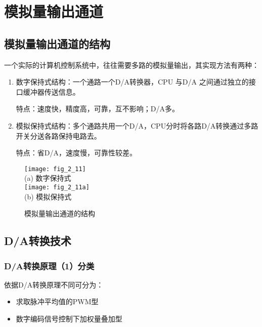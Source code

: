 \section{模拟量输出通道}


\subsection{模拟量输出通道的结构}


一个实际的计算机控制系统中，往往需要多路的模拟量输出，其实现方法有两种：

\begin{enumerate}
  \item 数字保持式结构：一个通路一个D/A转换器，CPU 与D/A 之间通过独立的接口缓冲器传送信息。

      特点：速度快，精度高，可靠，互不影响；D/A多。

  \item 模拟保持式结构：多个通路共用一个D/A，CPU分时将各路D/A转换通过多路开关分送各路保持电路去。

特点：省D/A，速度慢，可靠性较差。

\end{enumerate}

\begin{figure}[h]
  \centering
  \texttt{[image: fig\_2\_11]}\\(a) 数字保持式\\
  \texttt{[image: fig\_2\_11a]}\\(b) 模拟保持式
  \caption{模拟量输出通道的结构}\label{fig_2_11}
\end{figure}

\subsection{D/A转换技术}






\subsubsection{D/A转换原理（1）分类}

依据D/A转换原理不同可分为：

\begin{itemize}
\item 求取脉冲平均值的PWM型

\item 数字编码信号控制下加权量叠加型
\end{itemize}

